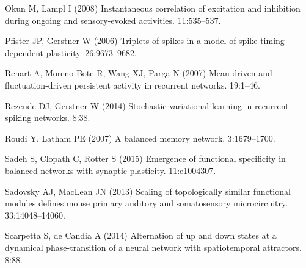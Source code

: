 \begin{thebibliography}{}

Okun M, Lampl I (2008{\rm{}})
\newblock Instantaneous correlation of excitation and inhibition during ongoing
  and sensory-evoked activities.
 11:535--537.

Pfister JP, Gerstner W (2006{\rm{}})
\newblock Triplets of spikes in a model of spike timing-dependent plasticity.
 26:9673--9682.

Renart A, Moreno-Bote R, Wang XJ, Parga N (2007{\rm{}})
\newblock Mean-driven and fluctuation-driven persistent activity in recurrent networks.
 19:1--46.

Rezende DJ, Gerstner W (2014{\rm{}})
\newblock Stochastic variational learning in recurrent spiking networks.
 8:38.

Roudi Y, Latham PE (2007{\rm{}})
\newblock A balanced memory network.
 3:1679--1700.

Sadeh S, Clopath C, Rotter S (2015{\rm{}})
\newblock Emergence of functional specificity in balanced networks with synaptic plasticity.
 11:e1004307.

Sadovsky AJ, MacLean JN (2013{\rm{}})
\newblock Scaling of topologically similar functional modules defines mouse
  primary auditory and somatosensory microcircuitry.
 33:14048--14060.

Scarpetta S, de Candia A (2014{\rm{}})
\newblock Alternation of up and down states at a dynamical phase-transition of a neural network with spatiotemporal attractors.
 8:88.



\end{thebibliography}
